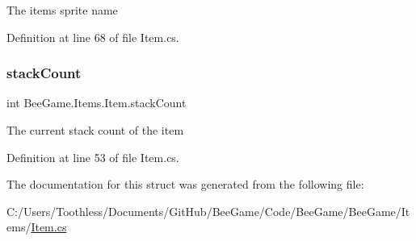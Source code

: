 The items sprite name 



Definition at line 68 of file Item.\+cs.

\mbox{\label{struct_bee_game_1_1_items_1_1_item_aaa169917b0e0f8472f20398d5d448388}} 
\subsubsection{\texorpdfstring{stack\+Count}{stackCount}}
{\footnotesize\ttfamily int Bee\+Game.\+Items.\+Item.\+stack\+Count}



The current stack count of the item 



Definition at line 53 of file Item.\+cs.



The documentation for this struct was generated from the following file\+:\begin{DoxyCompactItemize}
\item 
C\+:/\+Users/\+Toothless/\+Documents/\+Git\+Hub/\+Bee\+Game/\+Code/\+Bee\+Game/\+Bee\+Game/\+Items/\hyperlink{_item_8cs}{Item.\+cs}\end{DoxyCompactItemize}

